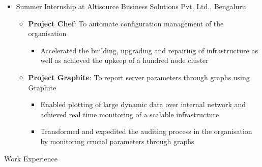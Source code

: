 \documentclass{article}
\begin{document}
\begin{itemize}[leftmargin=0.07cm]
\item {\large Summer Internship at Altisource Business Solutions Pvt. Ltd., Bengaluru}\hspace*{\fill}
\vspace{-0cm}
	\begin{itemize}[leftmargin=0.07cm]
	\item \textbf{Project Chef}: To automate configuration management of the organisation\\
	\vspace{-0.2cm}
	\begin{itemize}
	\item Accelerated the building, upgrading and repairing of infrastructure as well as achieved the upkeep of a hundred node cluster \end{itemize}
	\vspace{0cm}
	\item \textbf{Project Graphite}: To report server parameters through graphs using Graphite\\
	\vspace{-0.2cm}
	\begin{itemize}
	\item Enabled plotting of large dynamic data over internal network and achieved real time monitoring of a scalable infrastructure 
	\item Transformed and expedited the auditing process in the organisation by monitoring crucial parameters through graphs 
	\end{itemize}
	\end{itemize}
\end{itemize}
{\Large Work Experience}
\renewcommand{\labelitemii}{$\bullet$}
\end{document}
